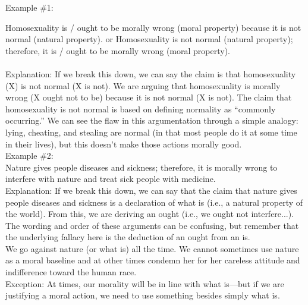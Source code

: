 \documentclass[a4paper,12pt,single,pdftex]{scrbook}
\begin{document}
{      Example \#1:
    
    
       
    
    
      Homosexuality is / ought to be morally wrong (moral property) because it is not normal (natural property). \newline
or \newline
Homosexuality is not normal (natural property); therefore, it is / ought to be morally wrong (moral property).
    \\

    
       
    \\

    
      
        Explanation: If we break this down, we can say the claim is that homosexuality (X) is not normal (X is not). We are arguing that homosexuality is morally wrong (X ought not to be) because it is not normal (X is not). The claim that homosexuality is not normal is based on defining normality as “commonly occurring.” We can see the flaw in this argumentation through a simple analogy: lying, cheating, and stealing are normal (in that most people do it at some time in their lives), but this doesn’t make those actions morally good.
      \\

      
        Example \#2:
      \\

      
        Nature gives people diseases and sickness; therefore, it is morally wrong to interfere with nature and treat sick people with medicine.
      \\

      
        Explanation: If we break this down, we can say that the claim that nature gives people diseases and sickness is a declaration of what is (i.e., a natural property of the world). From this, we are deriving an ought (i.e., we ought not interfere...). The wording and order of these arguments can be confusing, but remember that the underlying fallacy here is the deduction of an ought from an is.
      \\

      
        We go against nature (or what is) all the time. We cannot sometimes use nature as a moral baseline and at other times condemn her for her careless attitude and indifference toward the human race.
      \\

      
        Exception: At times, our morality will be in line with what is—but if we are justifying a moral action, we need to use something besides simply what is.
      \\

}
\end{document}

